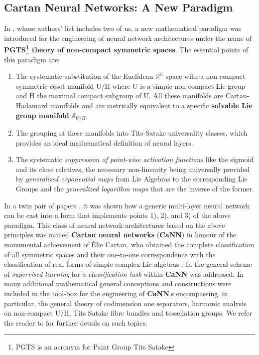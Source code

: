 \documentclass[10pt,a4paper]{article}
\begin{document}
\subsection{Cartan Neural Networks: A New Paradigm}
In \cite{pgtstheory}, whose authors' list includes two of us, a  new mathematical paradigm was introduced for the engineering of neural network architectures under the name of \textbf{PGTS\footnote{PGTS is an acronym for Paint Group Tits Satake} theory of non-compact symmetric spaces}. The essential points of this paradigm are:
\begin{enumerate}
\item The systematic substitution of the Euclidean $\mathbb{R}^n$ space with a non-compact symmetric coset manifold $\mathrm{U/H}$ where $\mathrm{U}$ is a
    simple non-compact Lie group  and $\mathrm{H}$ the  maximal compact subgroup of  $\mathrm{U}$. All these manifolds are Cartan-Hadamard manifolds and are  metrically equivalent to a specific \textbf{solvable Lie group manifold}
    $\mathcal{S}_{U/H}$.
\item The grouping of these manifolds into Tits-Satake universality classes, which provides an ideal mathematical definition of neural layers.
\item The systematic \textit{suppression of point-wise activation functions} like the sigmoid and its close relatives, the
necessary non-linearity being universally provided by  \textit{generalized exponential maps} from Lie Algebras to the corresponding Lie Groups and
the \textit{generalized logarithm maps} that are the inverse of the former.
\end{enumerate}
In a twin pair of papers \cite{TSnaviga,naviga}, it was shown how a generic multi-layer neural network can be cast into a form that implements points 1), 2), and 3) of the above paradigm. This class of neural network architectures based on the above principles was named \textbf{Cartan neural networks} (\textbf{CaNN}) in honour of the monumental achievement of Èlie Cartan, who obtained the complete classification of all symmetric spaces and their one-to-one correspondence with the classification of real forms of simple complex Lie algebras \cite{cartan_1926,
Helgasonobook,fre2023book,magnea_introduction_2002}.
In \cite{TSnaviga,naviga}  the general scheme of \textit{supervised learning} for a  \textit{classification task}
within \textbf{CaNN} was addressed. In \cite{tassellandum} many additional mathematical general conceptions and constructions were included in the tool-box for the engineering of \textbf{CaNN}.s encompassing, in particular, the general theory of codimension one separators, harmonic analysis on non-compact $\mathrm{U/H}$, Tits Satake fibre bundles and tessellation groups. We refer the reader to \cite{tassellandum} for further details on such topics.
\end{document}
